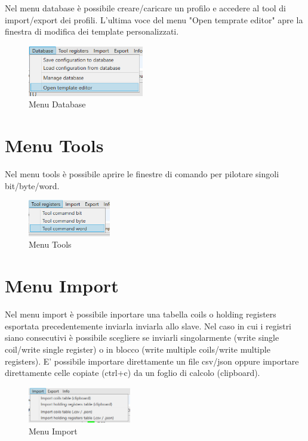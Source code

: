 Nel menu database è possibile creare/caricare un profilo e accedere al tool di import/export dei
profili. L'ultima voce del menu "Open temprate editor" apre la finestra di modifica dei template
personalizzati.

\begin{figure}[H]
\centering
\includegraphics[width=0.45\textwidth]{../Img/Menu_Database.PNG}
\caption{Menu Database}
\end{figure}

\section{Menu Tools}

Nel menu tools è possibile aprire le finestre di comando per pilotare singoli bit/byte/word.

\begin{figure}[H]
\centering
\includegraphics[width=0.32\textwidth]{../Img/Menu_Tools.PNG}
\caption{Menu Tools}
\end{figure}

\section{Menu Import}

Nel menu import è possibile inportare una tabella 
coils o holding registers esportata precedentemente
inviarla inviarla allo slave. Nel caso in cui i registri 
siano consecutivi è possibile scegliere se
inviarli singolarmente (write single coil/write single register) o in blocco 
(write multiple coils/write multiple registers).
E' possibile importare direttamente un file csv/json oppure
importare direttamente celle copiate (ctrl+c) da un foglio di calcolo
(clipboard).

\begin{figure}[H]
\centering
\includegraphics[width=0.4\textwidth]{../Img/Menu_Import.PNG}
\caption{Menu Import}
\end{figure}

